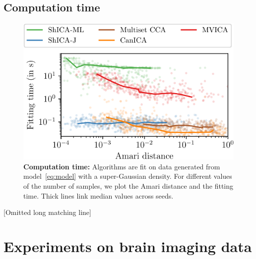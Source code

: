 \subsection{Computation time}
\begin{figure}
    \centering
    \includegraphics[width=.65\linewidth]{./figures/amvica/synthetic_Gaussian_timings.pdf}
    \caption{\textbf{Computation time: } Algorithms are fit on data generated from model~\eqref{eq:model} with a super-Gaussian density. For different values of the number of samples, we plot the Amari distance and the fitting time. Thick lines link median values across seeds.}
    \label{exp:syn_timings}
\end{figure}
[Omitted long matching line]
%




\section{Experiments on brain imaging data}

